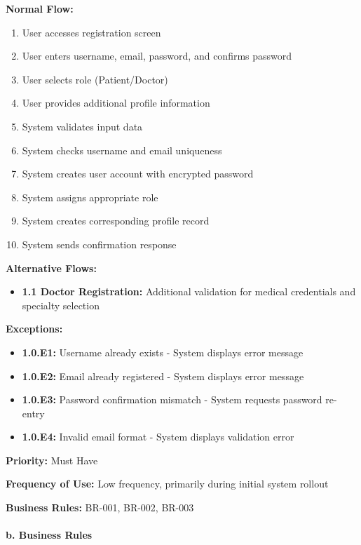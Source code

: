 \documentclass[12pt,a4paper]{article}
\begin{document}
\textbf{Normal Flow:}
\begin{enumerate}
    \item User accesses registration screen
    \item User enters username, email, password, and confirms password
    \item User selects role (Patient/Doctor)
    \item User provides additional profile information
    \item System validates input data
    \item System checks username and email uniqueness
    \item System creates user account with encrypted password
    \item System assigns appropriate role
    \item System creates corresponding profile record
    \item System sends confirmation response
\end{enumerate}

\textbf{Alternative Flows:}
\begin{itemize}
    \item \textbf{1.1 Doctor Registration:} Additional validation for medical credentials and specialty selection
\end{itemize}

\textbf{Exceptions:}
\begin{itemize}
    \item \textbf{1.0.E1:} Username already exists - System displays error message
    \item \textbf{1.0.E2:} Email already registered - System displays error message
    \item \textbf{1.0.E3:} Password confirmation mismatch - System requests password re-entry
    \item \textbf{1.0.E4:} Invalid email format - System displays validation error
\end{itemize}

\textbf{Priority:} Must Have

\textbf{Frequency of Use:} Low frequency, primarily during initial system rollout

\textbf{Business Rules:} BR-001, BR-002, BR-003

\paragraph{b. Business Rules}
\end{document}
